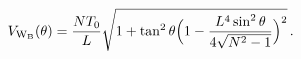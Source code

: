\begin{equation}
\label{potmic}
V_{\rm W_B}(\theta)=\frac{NT_0}{L}\sqrt{1+\tan^2{\theta}
\Bigl(1-\frac{L^4\sin^2{\theta}}{4\sqrt{N^2-1}}\Bigr)^2}\, .
\end{equation}

